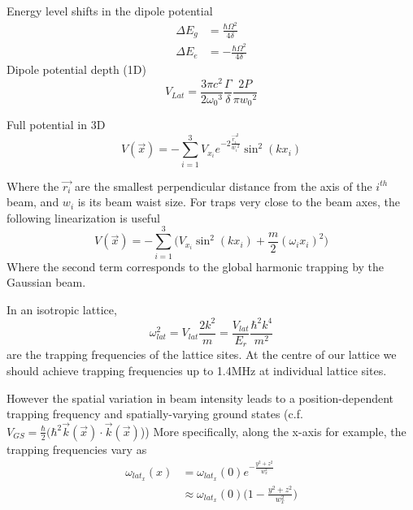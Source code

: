 Energy level shifts in the dipole potential
\begin{equation}
\begin{split}
	\Delta E_g &= \frac{\hbar\Omega^2}{4\delta}\\
	\Delta E_e &= -\frac{\hbar\Omega^2}{4\delta}
\end{split}
\end{equation}
Dipole potential depth (1D)
\begin{equation}
	V_{Lat} = \frac{3\pi c^2}{2{\omega_0}^3}\frac{\Gamma}{\delta}\frac{2P}{\pi {w_0}^2} 
\end{equation}

Full potential in 3D
\begin{equation}
	V(\vec{x}) = -\sum_{i=1}^3 V_{x_i} e^{-2\frac{{\vec{r_i}}^2}{{w_i}^2}} \sin^2(k x_i)
\end{equation}

Where the $\vec{r_i}$ are the smallest perpendicular distance from the axis of the $i^{th}$ beam, and $w_i$ is its beam waist size. 
For traps very close to the beam axes, the following linearization is useful
\begin{equation}
	V(\vec{x}) = -\sum_{i=1}^3\Big( V_{x_i} \sin^2(k x_i) + \frac{m}{2}(\omega_i x_i)^2\Big)
\end{equation}
Where the second term corresponds to the global harmonic trapping by the Gaussian beam.

In an isotropic lattice,
\begin{equation}
	\omega_{lat} ^2 = V_{lat} \frac{2 k^2}{m} = \frac{V_{lat}}{E_r}\frac{\hbar^2 k^4}{m^2}
\end{equation}
 are the trapping frequencies of the lattice sites. At the centre of our lattice we should achieve trapping frequencies up to 1.4MHz at individual lattice sites. 

However the spatial variation in beam intensity leads to a position-dependent trapping frequency and spatially-varying ground states (c.f. $V_{GS} = \frac{\hbar}{2}(\hbar^2 \vec{k}(\vec{x})\cdot\vec{k}(\vec{x}) $))
More specifically, along the x-axis for example, the trapping frequencies vary as
\begin{equation}
\begin{split}
	\omega_{lat_x}(x) &= \omega_{lat_x}(0) e^{-\frac{y^2+z^2}{w_x ^2}}\\
	& \approx \omega_{lat_x}(0)\big(1-\frac{y^2+z^2}{w_x ^2}\big)
\end{split}
\end{equation}

